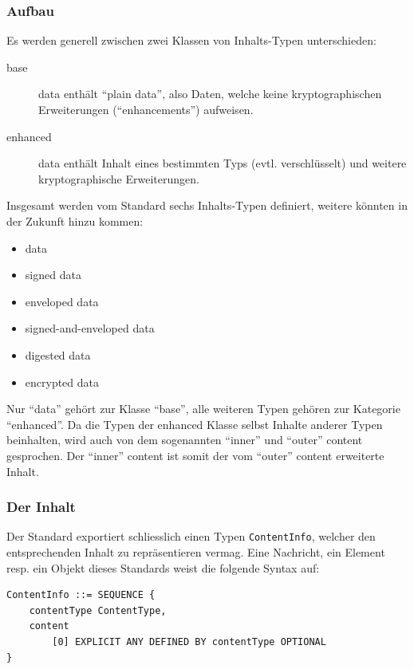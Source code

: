 \documentclass[10pt,a4paper]{article}
\begin{document}
\subsubsection{Aufbau}

Es werden generell zwischen zwei Klassen von Inhalts-Typen unterschieden:
\begin{description}
    \item[base] data enthält "`plain data"', also Daten, welche keine kryptographischen
        Erweiterungen ("`enhancements"') aufweisen.
    \item[enhanced] data enthält Inhalt eines bestimmten Typs (evtl. verschlüsselt) und
        weitere kryptographische Erweiterungen.
\end{description}

Insgesamt werden vom Standard sechs Inhalts-Typen definiert, weitere könnten in der
Zukunft hinzu kommen:
\label{list:content-types}
\begin{itemize}
    \item data
    \item signed data
    \item enveloped data
    \item signed-and-enveloped data
    \item digested data
    \item encrypted data
\end{itemize}

Nur "`data"' gehört zur Klasse "`base"', alle weiteren Typen gehören zur Kategorie
"`enhanced"'. Da die Typen der enhanced Klasse selbst Inhalte anderer Typen beinhalten,
wird auch von dem sogenannten "`inner"' und "`outer"' content gesprochen. Der "`inner"'
content ist somit der vom "`outer"' content erweiterte Inhalt.

\subsubsection{Der Inhalt}

Der Standard exportiert schliesslich einen Typen \texttt{ContentInfo}, welcher den
entsprechenden Inhalt zu repräsentieren vermag. Eine Nachricht, ein Element resp. ein
Objekt dieses Standards weist die folgende Syntax auf:

\begin{verbatim}
ContentInfo ::= SEQUENCE {
    contentType ContentType,
    content
        [0] EXPLICIT ANY DEFINED BY contentType OPTIONAL
}
\end{verbatim}
\end{document}
